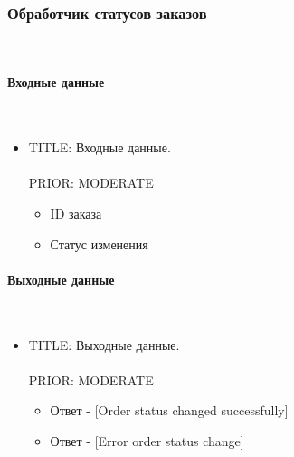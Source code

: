 \subsubsection{Обработчик статусов заказов} \mbox{} \\ \label{service_order_status_processing}

	\paragraph{Входные данные} \mbox{} \\ \label{}

      \begin{itemize}

        \item{

          TITLE: Входные данные.\\
          \\
          PRIOR: MODERATE\\

        }

        \begin{itemize}
          \item ID заказа
          \item Статус изменения
        \end{itemize}

      \end{itemize}

    \paragraph{Выходные данные} \mbox{} \\

      \begin{itemize}

        \item{

          TITLE: Выходные данные.\\
          \\
          PRIOR: MODERATE\\

        }

        \begin{itemize}
          \item Ответ - [Order status changed successfully]
          \item Ответ - [Error order status change]
        \end{itemize}

      \end{itemize}

